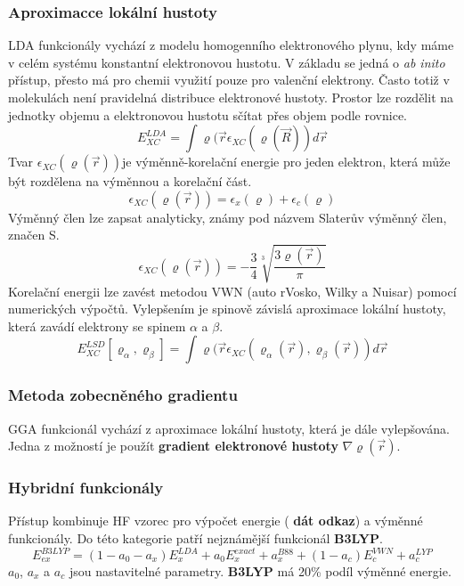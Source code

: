 \documentclass[
  digital, %
  table,   %
  lof,     %
  lot,     %
]{fithesis3}
\begin{document}
\subsubsection{Aproximacce lokální hustoty}
LDA funkcionály vychází z modelu homogenního elektronového plynu, kdy máme v celém systému konstantní elektronovou hustotu.\cite{dftshrnutivysledky} V základu se jedná o \textit{ab inito} přístup, přesto má pro chemii využití pouze pro valenční elektrony. Často totiž v molekulách není pravidelná distribuce elektronové hustoty. Prostor lze rozdělit na jednotky objemu a elektronovou hustotu sčítat přes objem podle rovnice.
\begin{equation}
E_{XC}^{LDA} = \int \varrho (\vec{r} \epsilon_{XC} (\varrho (\vec{R})) d \vec{r}
\label{LDA_vyraz_pro_obecnou_energii}
\end{equation}
Tvar $\epsilon_{XC}(\varrho (\vec{r}))$je výměnně-korelační energie pro jeden elektron, která může být rozdělena na výměnnou a korelační část. 
\begin{equation}
\epsilon_{XC}(\varrho (\vec{r})) = \epsilon_x (\varrho) + \epsilon_c (\varrho)
\label{LDA_tvar_vymene_korelacni_energie}
\end{equation}
Výměnný člen lze zapsat analyticky, známy pod názvem Slaterův výměnný člen, značen S.
\begin{equation}
\epsilon_{XC}(\varrho (\vec{r})) = - \frac{3}{4} \sqrt[3]{\frac{3 \varrho (\vec{r})}{\pi}}
\label{LDA_vymenny_clen}
\end{equation}
Korelační energii lze zavést metodou VWN (auto rVosko, Wilky a Nuisar) pomocí numerických výpočtů. Vylepšením je spinově závislá aproximace lokální hustoty, která zavádí elektrony se spinem $\alpha$ a $\beta$.
\begin{equation}
E_{XC}^{LSD}[\varrho_{\alpha}, \varrho_{\beta}] = \int \varrho (\vec{r} \epsilon_{XC}( \varrho_{\alpha}(\vec{r}), \varrho_{\beta}(\vec{r})) d \vec{r}
\end{equation}
\cite{koch2000chemist}
\subsubsection{Metoda zobecněného gradientu}
GGA funkcionál vychází z aproximace lokální hustoty, která je dále vylepšována. Jedna z možností je použít \textbf{gradient elektronové hustoty} $\nabla \varrho (\vec{r})$.  \cite{koch2000chemist}

\subsubsection{Hybridní funkcionály}
Přístup kombinuje HF vzorec pro výpočet energie ( \textbf{dát odkaz}) a výměnné funkcionály. Do této kategorie patří nejznámější funkcionál \textbf{B3LYP}.
\begin{equation}
E_{ex}^{B3LYP} = (1-a_0-a_x)E_x^{LDA} + a_0E_x^{exact} + a_x^{B88} + (1-a_c)E_c^{VWN} + a_c^{LYP}
\label{B3LYP_rovnice}
\end{equation}
$a_0$, $a_x$ a $a_c$ jsou nastavitelné parametry. \textbf{B3LYP} má 20\% podíl výměnné energie. \cite{dftshrnutivysledky}
\end{document}
